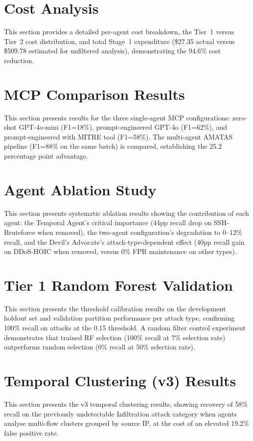 \documentclass[12pt,openany,oneside,a4paper]{book}
\begin{document}
\section{Cost Analysis}
\label{sec:cost-analysis}
This section provides a detailed per-agent cost breakdown, the Tier~1 versus Tier~2 cost distribution, and total Stage~1 expenditure (\$27.35 actual versus \$509.78 estimated for unfiltered analysis), demonstrating the 94.6\% cost reduction.

\section{MCP Comparison Results}
\label{sec:mcp-results}
This section presents results for the three single-agent MCP configurations: zero-shot GPT-4o-mini (F1=18\%), prompt-engineered GPT-4o (F1=62\%), and prompt-engineered with MITRE tool (F1=58\%). The multi-agent AMATAS pipeline (F1=88\% on the same batch) is compared, establishing the 25.2 percentage point advantage.

\section{Agent Ablation Study}
\label{sec:agent-ablation}
This section presents systematic ablation results showing the contribution of each agent: the Temporal Agent's critical importance (44pp recall drop on SSH-Bruteforce when removed), the two-agent configuration's degradation to 0--12\% recall, and the Devil's Advocate's attack-type-dependent effect (40pp recall gain on DDoS-HOIC when removed, versus 0\% FPR maintenance on other types).

\section{Tier 1 Random Forest Validation}
\label{sec:tier1-validation}
This section presents the threshold calibration results on the development holdout set and validation partition performance per attack type, confirming 100\% recall on attacks at the 0.15 threshold. A random filter control experiment demonstrates that trained RF selection (100\% recall at 7\% selection rate) outperforms random selection (0\% recall at 50\% selection rate).

\section{Temporal Clustering (v3) Results}
\label{sec:v3-results}
This section presents the v3 temporal clustering results, showing recovery of 58\% recall on the previously undetectable Infiltration attack category when agents analyse multi-flow clusters grouped by source IP, at the cost of an elevated 19.2\% false positive rate.
\end{document}
